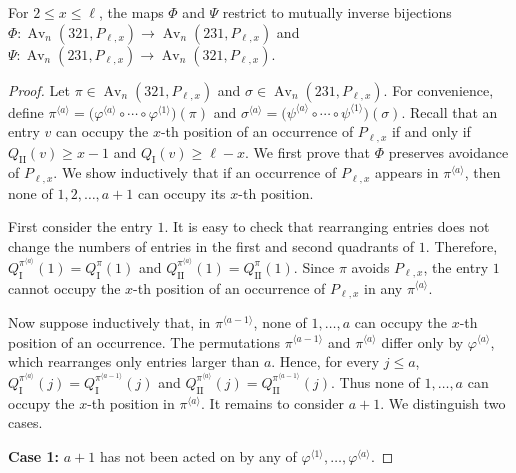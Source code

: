 \documentclass[10pt,a4paper]{amsart}
\begin{document}
\begin{thm}\label{thm:Phi-Psi-preserve-POP}
For $2\leq x\leq\ell$, the maps $\Phi$ and $\Psi$ restrict to
mutually inverse bijections
$\Phi:
\operatorname{Av}_n(321,P_{\ell,x})
\longrightarrow
\operatorname{Av}_n(231,P_{\ell,x})$
and
$
\Psi:
\operatorname{Av}_n(231,P_{\ell,x})
\longrightarrow
\operatorname{Av}_n(321,P_{\ell,x})$.
\end{thm}

\begin{proof}
Let $\pi\in\operatorname{Av}_n(321,P_{\ell,x})$ and
$\sigma\in\operatorname{Av}_n(231,P_{\ell,x})$.
For convenience, define
$
\pi^{\langle a\rangle}
=
\bigl(
\varphi^{\langle a\rangle}\circ\cdots\circ
\varphi^{\langle1\rangle}
\bigr)(\pi)$
and
$
\sigma^{\langle a\rangle}
=
\bigl(
\psi^{\langle a\rangle}\circ\cdots\circ
\psi^{\langle1\rangle}
\bigr)(\sigma)$.
Recall that an entry $v$ can occupy the $x$-th position of an occurrence
of $P_{\ell,x}$ if and only if
$Q_{\mathrm{II}}(v)\geq x-1$ and
$Q_{\mathrm I}(v)\geq\ell-x$.
We first prove that $\Phi$ preserves avoidance of $P_{\ell,x}$. We
show inductively that if an occurrence of $P_{\ell,x}$ appears in
$\pi^{\langle a\rangle}$, then none of $1,2,\ldots,a+1$
can occupy its $x$-th position.

First consider the entry $1$. It is easy to check that rearranging entries does not change
the numbers of entries in the first and second quadrants of $1$.
Therefore,
$Q_{\mathrm I}^{\pi^{\langle a\rangle}}(1)
=
Q_{\mathrm I}^{\pi}(1)$ and
$Q_{\mathrm{II}}^{\pi^{\langle a\rangle}}(1)
=
Q_{\mathrm{II}}^{\pi}(1)$.
Since $\pi$ avoids $P_{\ell,x}$, the entry $1$ cannot occupy the
$x$-th position of an occurrence of $P_{\ell,x}$ in any
$\pi^{\langle a\rangle}$.

Now suppose inductively that, in $\pi^{\langle a-1\rangle}$, none of
$1,\ldots,a$ can occupy the $x$-th position of an occurrence. The
permutations $\pi^{\langle a-1\rangle}$ and
$\pi^{\langle a\rangle}$ differ only by
$\varphi^{\langle a\rangle}$, which rearranges only entries larger than
$a$. Hence, for every $j\leq a$,
$Q_{\mathrm I}^{\pi^{\langle a\rangle}}(j)
=
Q_{\mathrm I}^{\pi^{\langle a-1\rangle}}(j)$
and
$Q_{\mathrm{II}}^{\pi^{\langle a\rangle}}(j)
=
Q_{\mathrm{II}}^{\pi^{\langle a-1\rangle}}(j)$.
Thus none of $1,\ldots,a$ can occupy the $x$-th position in
$\pi^{\langle a\rangle}$. It remains to consider $a+1$.
We distinguish two cases.

\noindent \textbf{Case 1:} $a+1$ has not been acted on by any of
$\varphi^{\langle1\rangle},\ldots,\varphi^{\langle a\rangle}$.


\end{proof}
\end{document}
